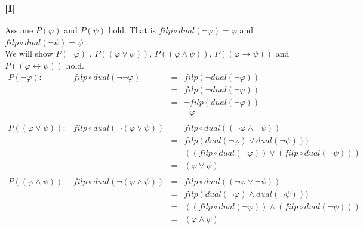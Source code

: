 \documentclass{article} %
\begin{document}
\subsubsection*{[I]}
Assume $P(\varphi)$ and $P(\psi)$ hold. That is $filp \circ dual(\neg \varphi) = \varphi$ and $filp \circ dual(\neg \psi) = \psi$ .\\
We will show $P(\neg \varphi)$ , $P((\varphi \vee \psi))$, $P((\varphi \wedge \psi))$, $P((\varphi \to \psi))$ and $P((\varphi \leftrightarrow \psi))$ hold.\\
\[\begin{array}{lrll}
    P(\neg \varphi):&           filp\circ dual(\neg \neg \varphi)   &=& filp(\neg dual(\neg \varphi))\\
                                                                &   &=& filp(\neg dual(\neg \varphi))\\
                                                                &   &=& \neg filp(dual(\neg \varphi))\\
                                                                &   &=& \neg \varphi\\                                                           
\\
    P((\varphi \vee \psi)):&    filp\circ dual(\neg (\varphi \vee \psi)) &=& filp\circ dual((\neg \varphi \wedge \neg \psi))\\
                                                                        &&=& filp(dual(\neg \varphi) \vee dual(\neg \psi)))\\
                                                                        &&=& ((filp\circ dual(\neg \varphi)) \vee (filp\circ dual(\neg \psi)))\\
                                                                        &&=& (\varphi \vee \psi)\\
\\
    P((\varphi \wedge \psi)):&  filp\circ dual(\neg (\varphi \wedge \psi)) &=& filp\circ dual((\neg \varphi \vee \neg \psi))\\
                                                                        &&=& filp(dual(\neg \varphi) \wedge dual(\neg \psi)))\\
                                                                        &&=& ((filp\circ dual(\neg \varphi)) \wedge (filp\circ dual(\neg \psi)))\\
                                                                        &&=& (\varphi \wedge \psi)\\

\end{array}\]
\end{document}
